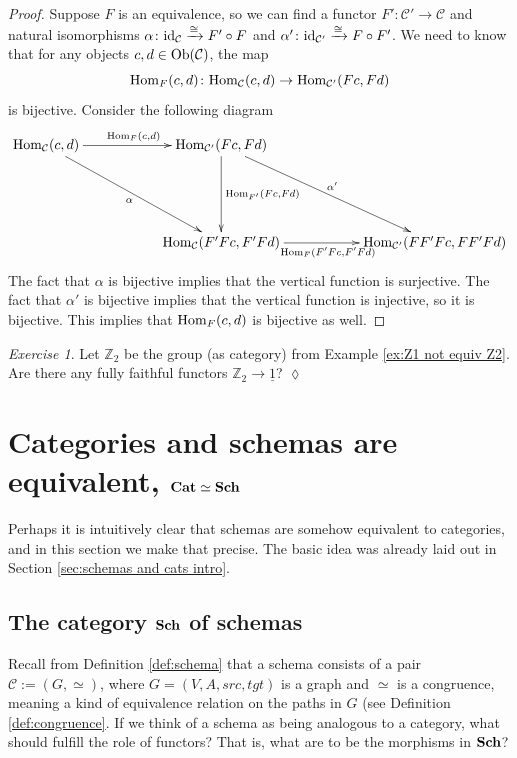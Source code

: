 \documentclass{book}
\def\tn{\textnormal}
\def\mc{\mathcal}
\def\ZZ{{\mathbb Z}}
\def\Hom{\tn{Hom}}
\def\Ob{\tn{Ob}}
\def\to{\rightarrow}
\def\taking{\colon}
\def\iso{\cong}
\def\ul{\underline}
\newcommand{\To}[1]{\xrightarrow{#1}}
\def\id{\tn{id}}
\def\Cat{{\bf Cat}}
\def\mcC{\mc{C}}
\theoremstyle{remark}
\newtheorem{exc}[subsubsection]{Exercise}
\newenvironment{exercise}{\begin{exc}}{\hspace*{\fill}$\lozenge$\end{exc}}
\theoremstyle{definition}
\def\Sch{{\bf Sch}}
\begin{document}
\begin{proof}

Suppose $F$ is an equivalence, so we can find a functor $F'\taking\mcC'\to\mcC$ and natural isomorphisms $\alpha\taking\id_\mcC\To{\iso}F'\circ F$ and $\alpha'\taking\id_{\mcC'}\To{\iso} F\circ F'$. We need to know that for any objects $c,d\in\Ob(\mcC)$, the map $$\Hom_F(c,d)\taking\Hom_\mcC(c,d)\to\Hom_{\mcC'}(Fc,Fd)$$ is bijective. Consider the following diagram 
$$
\xymatrix{
\Hom_\mcC(c,d)\ar[rr]^{\Hom_F(c,d)}\ar[ddrr]_\alpha&&\Hom_{\mcC'}(Fc,Fd)\ar[ddrr]^{\alpha'}\ar[dd]^{\Hom_{F'}(Fc,Fd)}\\\\
&&\Hom_\mcC(F'Fc,F'Fd)\ar[rr]_{\Hom_{F}(F'Fc,F'Fd)}&&\Hom_{\mcC'}(FF'Fc,FF'Fd)
}
$$
The fact that $\alpha$ is bijective implies that the vertical function is surjective. The fact that $\alpha'$ is bijective implies that the vertical function is injective, so it is bijective. This implies that $\Hom_F(c,d)$ is bijective as well.

\end{proof}

\begin{exercise}
Let $\ZZ_2$ be the group (as category) from Example \ref{ex:Z1 not equiv Z2}. Are there any fully faithful functors $\ZZ_2\to\ul{1}$?
\end{exercise}


\section{Categories and schemas are equivalent, $\Cat\simeq\Sch$}\label{sec:cat equiv sch}

Perhaps it is intuitively clear that schemas are somehow equivalent to categories, and in this section we make that precise. The basic idea was already laid out in Section \ref{sec:schemas and cats intro}.


\subsection{The category $\Sch$ of schemas}\label{sec:sch as category}

Recall from Definition \ref{def:schema} that a schema consists of a pair $\mcC:=(G,\simeq)$, where $G=(V,A,src,tgt)$ is a graph and $\simeq$ is a congruence, meaning a kind of equivalence relation on the paths in $G$ (see Definition \ref{def:congruence}. If we think of a schema as being analogous to a category, what should fulfill the role of functors? That is, what are to be the morphisms in $\Sch$?
\end{document}
